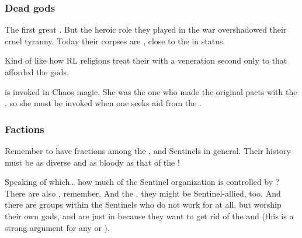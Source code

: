 \subsubsection{Dead gods}
The first great \dragonlords {}. 
But the heroic role they played in the war overshadowed their cruel tyranny. 
Today their corpses are , close to the \xss{} in status. 

Kind of like how RL religions treat their  with a veneration second only to that afforded the gods. 



\Tiamat{} is invoked in Chaos magic. 
She was the one who made the original pacts with the \xss, so she must be invoked when one seeks aid from the \xss. 






\subsubsection{Factions}
Remember to have fractions among the \dragons{}, and Sentinels in general. 
Their history must be as diverse and as bloody as that of the \resphain!

Speaking of which\ldots{} how much of the Sentinel organization is controlled by \dragons? There are also \rachyth, remember. And the \Baelzerach, they might be Sentinel-allied, too. And there are groups within the Sentinels who do not work for \dragons{} at all, but worship their own gods, and are just in because they want to get rid of the \banes{} and \resphain{} (this is a strong argument for any \scatha{} or \rachyth). 


